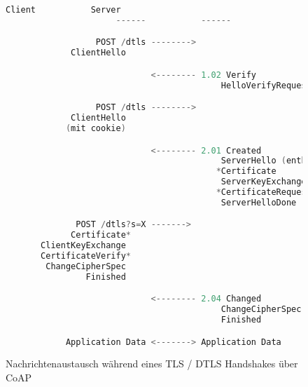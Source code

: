 \begin{figure}[ht]
  \centering
  \begin{lstlisting}[language=c]
                      Client           Server
                      ------           ------

                  POST /dtls -------->
             ClientHello

                             <-------- 1.02 Verify
                                           HelloVerifyRequest

                  POST /dtls -------->
             ClientHello
            (mit cookie)

                             <-------- 2.01 Created
                                           ServerHello (enthält Session X)
                                          *Certificate
                                           ServerKeyExchange
                                          *CertificateRequest
                                           ServerHelloDone

              POST /dtls?s=X ------->
             Certificate*
       ClientKeyExchange
       CertificateVerify*
        ChangeCipherSpec
                Finished

                             <-------- 2.04 Changed
                                           ChangeCipherSpec
                                           Finished

            Application Data <-------> Application Data
  \end{lstlisting}
  \caption{Nachrichtenaustausch während eines TLS / DTLS Handshakes über CoAP}
  \label{fig:coaphandshake}
\end{figure}

